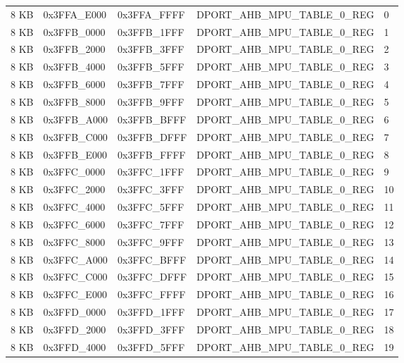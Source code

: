 \begin{longtable}[h]{|p{1.5cm}|p{3cm}|p{3cm}|p{6cm}|p{1.5cm}|}
    \rowcolor{gray!25}
    \multicolumn{5}{|c|}{片上 SRAM 2} \\
    \hline
    8 KB & 0x3FFA\_E000 & 0x3FFA\_FFFF & DPORT\_AHB\_MPU\_TABLE\_0\_REG & 0 \\
    \hline
    8 KB & 0x3FFB\_0000 & 0x3FFB\_1FFF & DPORT\_AHB\_MPU\_TABLE\_0\_REG & 1 \\
    \hline
    8 KB & 0x3FFB\_2000 & 0x3FFB\_3FFF & DPORT\_AHB\_MPU\_TABLE\_0\_REG & 2 \\
    \hline
    8 KB & 0x3FFB\_4000 & 0x3FFB\_5FFF & DPORT\_AHB\_MPU\_TABLE\_0\_REG & 3 \\
    \hline
    8 KB & 0x3FFB\_6000 & 0x3FFB\_7FFF & DPORT\_AHB\_MPU\_TABLE\_0\_REG & 4 \\
    \hline
    8 KB & 0x3FFB\_8000 & 0x3FFB\_9FFF & DPORT\_AHB\_MPU\_TABLE\_0\_REG & 5 \\
    \hline
    8 KB & 0x3FFB\_A000 & 0x3FFB\_BFFF & DPORT\_AHB\_MPU\_TABLE\_0\_REG & 6 \\
    \hline
    8 KB & 0x3FFB\_C000 & 0x3FFB\_DFFF & DPORT\_AHB\_MPU\_TABLE\_0\_REG & 7 \\
    \hline
    8 KB & 0x3FFB\_E000 & 0x3FFB\_FFFF & DPORT\_AHB\_MPU\_TABLE\_0\_REG & 8 \\
    \hline
    8 KB & 0x3FFC\_0000 & 0x3FFC\_1FFF & DPORT\_AHB\_MPU\_TABLE\_0\_REG & 9 \\
    \hline
    8 KB & 0x3FFC\_2000 & 0x3FFC\_3FFF & DPORT\_AHB\_MPU\_TABLE\_0\_REG & 10 \\
    \hline
    8 KB & 0x3FFC\_4000 & 0x3FFC\_5FFF & DPORT\_AHB\_MPU\_TABLE\_0\_REG & 11 \\
    \hline
    8 KB & 0x3FFC\_6000 & 0x3FFC\_7FFF & DPORT\_AHB\_MPU\_TABLE\_0\_REG & 12 \\
    \hline
    8 KB & 0x3FFC\_8000 & 0x3FFC\_9FFF & DPORT\_AHB\_MPU\_TABLE\_0\_REG & 13 \\
    \hline
    8 KB & 0x3FFC\_A000 & 0x3FFC\_BFFF & DPORT\_AHB\_MPU\_TABLE\_0\_REG & 14 \\
    \hline
    8 KB & 0x3FFC\_C000 & 0x3FFC\_DFFF & DPORT\_AHB\_MPU\_TABLE\_0\_REG & 15 \\
    \hline
    8 KB & 0x3FFC\_E000 & 0x3FFC\_FFFF & DPORT\_AHB\_MPU\_TABLE\_0\_REG & 16 \\
    \hline
    8 KB & 0x3FFD\_0000 & 0x3FFD\_1FFF & DPORT\_AHB\_MPU\_TABLE\_0\_REG & 17 \\
    \hline
    8 KB & 0x3FFD\_2000 & 0x3FFD\_3FFF & DPORT\_AHB\_MPU\_TABLE\_0\_REG & 18 \\
    \hline
    8 KB & 0x3FFD\_4000 & 0x3FFD\_5FFF & DPORT\_AHB\_MPU\_TABLE\_0\_REG & 19 \\

\end{longtable}
